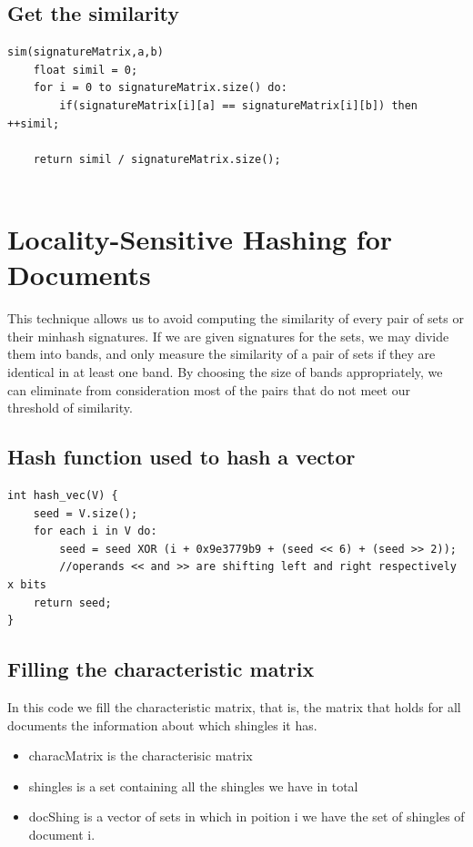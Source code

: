 \documentclass[12pt]{article}
\begin{document}
\subsection{Get the similarity}
\begin{lstlisting}
sim(signatureMatrix,a,b)
    float simil = 0;
    for i = 0 to signatureMatrix.size() do:
        if(signatureMatrix[i][a] == signatureMatrix[i][b]) then ++simil;
 
    return simil / signatureMatrix.size();


\end{lstlisting}

\section{Locality-Sensitive Hashing for Documents}
 This technique allows us to avoid computing the similarity of every pair of sets or their minhash signatures. If we are given signatures for the sets, we may divide them into bands, and only measure the similarity of a pair of sets if they are identical in at least one band. By choosing the size of bands appropriately, we can eliminate from consideration most of the pairs that do not meet our threshold of similarity.
 \medskip 
 
\subsection{Hash function used to hash a vector}
 \begin{lstlisting}
int hash_vec(V) {
	seed = V.size();
	for each i in V do:
		seed = seed XOR (i + 0x9e3779b9 + (seed << 6) + (seed >> 2));
		//operands << and >> are shifting left and right respectively x bits
	return seed;
}

\end{lstlisting}
 \medskip 

\subsection{Filling the characteristic matrix}
In this code we fill the characteristic matrix, that is, the matrix that holds for all documents the information about which shingles it has.
\begin{itemize}
\item characMatrix is the characterisic matrix
\item shingles is a set containing all the shingles we have in total
\item docShing is a vector of sets in which in poition i we have the set of shingles of document i. 
\end{itemize}
\end{document}
